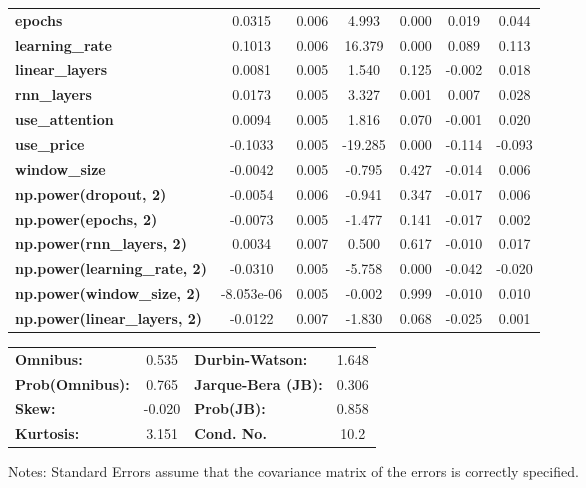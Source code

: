 \begin{center}
\begin{tabular}{lcccccc}
\textbf{epochs}                            &       0.0315  &        0.006     &     4.993  &         0.000        &        0.019    &        0.044     \\
\textbf{learning\_rate}                    &       0.1013  &        0.006     &    16.379  &         0.000        &        0.089    &        0.113     \\
\textbf{linear\_layers}                    &       0.0081  &        0.005     &     1.540  &         0.125        &       -0.002    &        0.018     \\
\textbf{rnn\_layers}                       &       0.0173  &        0.005     &     3.327  &         0.001        &        0.007    &        0.028     \\
\textbf{use\_attention}                    &       0.0094  &        0.005     &     1.816  &         0.070        &       -0.001    &        0.020     \\
\textbf{use\_price}                        &      -0.1033  &        0.005     &   -19.285  &         0.000        &       -0.114    &       -0.093     \\
\textbf{window\_size}                      &      -0.0042  &        0.005     &    -0.795  &         0.427        &       -0.014    &        0.006     \\
\textbf{np.power(dropout, 2)}              &      -0.0054  &        0.006     &    -0.941  &         0.347        &       -0.017    &        0.006     \\
\textbf{np.power(epochs, 2)}               &      -0.0073  &        0.005     &    -1.477  &         0.141        &       -0.017    &        0.002     \\
\textbf{np.power(rnn\_layers, 2)}          &       0.0034  &        0.007     &     0.500  &         0.617        &       -0.010    &        0.017     \\
\textbf{np.power(learning\_rate, 2)}       &      -0.0310  &        0.005     &    -5.758  &         0.000        &       -0.042    &       -0.020     \\
\textbf{np.power(window\_size, 2)}         &   -8.053e-06  &        0.005     &    -0.002  &         0.999        &       -0.010    &        0.010     \\
\textbf{np.power(linear\_layers, 2)}       &      -0.0122  &        0.007     &    -1.830  &         0.068        &       -0.025    &        0.001     \\
\bottomrule
\end{tabular}
\begin{tabular}{lclc}
\textbf{Omnibus:}       &  0.535 & \textbf{  Durbin-Watson:     } &    1.648  \\
\textbf{Prob(Omnibus):} &  0.765 & \textbf{  Jarque-Bera (JB):  } &    0.306  \\
\textbf{Skew:}          & -0.020 & \textbf{  Prob(JB):          } &    0.858  \\
\textbf{Kurtosis:}      &  3.151 & \textbf{  Cond. No.          } &     10.2  \\
\bottomrule
\end{tabular}
\end{center}

Notes: \newline
 [1] Standard Errors assume that the covariance matrix of the errors is correctly specified.